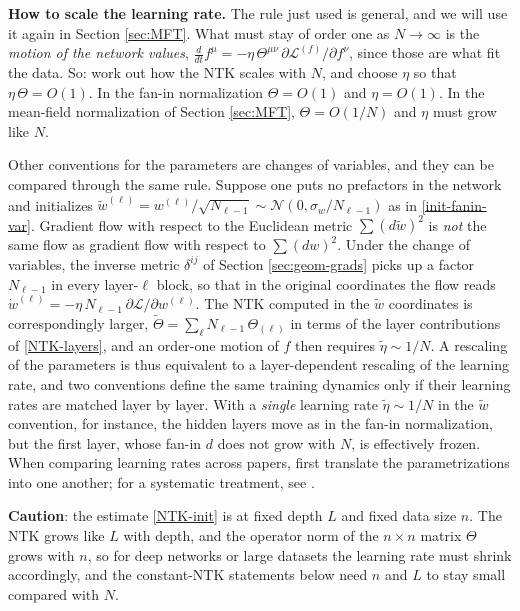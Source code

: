 \documentclass[11pt]{article}
\newcommand{\CN}{{\mathcal N}}
\newcommand{\CL}{{\mathcal L}}
\newcommand{\pd}{\partial}
\begin{document}
\begin{callout}[note]
\textbf{How to scale the learning rate.} The rule just used is general, and we will use it again in Section \ref{sec:MFT}. What must stay of order one as $N\to\infty$ is the \emph{motion of the network values}, $\frac{d}{dt}f^\mu = -\eta\,\Theta^{\mu\nu}\,\pd\CL^{(f)}/\pd f^\nu$, since those are what fit the data. So: work out how the NTK scales with $N$, and choose $\eta$ so that $\eta\,\Theta = O(1)$. In the fan-in normalization $\Theta = O(1)$ and $\eta = O(1)$. In the mean-field normalization of Section \ref{sec:MFT}, $\Theta = O(1/N)$ and $\eta$ must grow like $N$.

Other conventions for the parameters are changes of variables, and they can be compared through the same rule. Suppose one puts no prefactors in the network and initializes $\tilde w^{(\ell)} = w^{(\ell)}/\sqrt{N_{\ell-1}}\sim\CN(0,\sigma_w/N_{\ell-1})$ as in \eqref{init-fanin-var}. Gradient flow with respect to the Euclidean metric $\sum(d\tilde w)^2$ is \emph{not} the same flow as gradient flow with respect to $\sum(dw)^2$. Under the change of variables, the inverse metric $\delta^{ij}$ of Section \ref{sec:geom-grads} picks up a factor $N_{\ell-1}$ in every layer-$\ell$ block, so that in the original coordinates the flow reads $\dot w^{(\ell)} = -\eta\,N_{\ell-1}\,\pd\CL/\pd w^{(\ell)}$. The NTK computed in the $\tilde w$ coordinates is correspondingly larger, $\tilde\Theta = \sum_\ell N_{\ell-1}\,\Theta_{(\ell)}$ in terms of the layer contributions of \eqref{NTK-layers}, and an order-one motion of $f$ then requires $\tilde\eta\sim 1/N$. A rescaling of the parameters is thus equivalent to a layer-dependent rescaling of the learning rate, and two conventions define the same training dynamics only if their learning rates are matched layer by layer. With a \emph{single} learning rate $\tilde\eta\sim1/N$ in the $\tilde w$ convention, for instance, the hidden layers move as in the fan-in normalization, but the first layer, whose fan-in $d$ does not grow with $N$, is effectively frozen. When comparing learning rates across papers, first translate the parametrizations into one another; for a systematic treatment, see \cite{yang2021tensor}.
\end{callout}

\textbf{Caution}: the estimate \eqref{NTK-init} is at fixed depth $L$ and fixed data size $n$. The NTK grows like $L$ with depth, and the operator norm of the $n\times n$ matrix $\Theta$ grows with $n$, so for deep networks or large datasets the learning rate must shrink accordingly, and the constant-NTK statements below need $n$ and $L$ to stay small compared with $N$.
\end{document}
